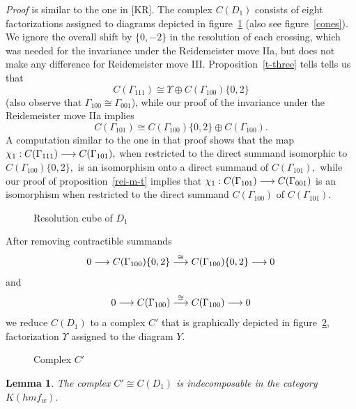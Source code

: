 \documentclass[12pt]{article}
\newtheorem{lemma}{Lemma}
\begin{document}
\emph{Proof} is similar to the one in [KR]. The complex $C(D_1)$ 
consists of eight factorizations assigned to  diagrams depicted in 
figure~\ref{rthree1} (also see figure~\ref{cones}). We ignore the 
overall shift by $\{0,-2\}$ in the resolution of each crossing, which was 
needed for the invariance under the Reidemeister move IIa, but does not
make any difference for Reidemeister move III. Proposition~\ref{t-three} 
tells tells us that 
$$C(\Gamma_{111}) \cong \Upsilon \oplus C(\Gamma_{100})\{0,2\}$$ 
(also observe that $\Gamma_{100}\cong \Gamma_{001}$),  
while our proof of the invariance under the Reidemeister move IIa implies 
$$ C(\Gamma_{101})\cong C(\Gamma_{100})\{0,2\} \oplus  C(\Gamma_{100}).$$ 
A computation similar to the one in that proof shows that the map 
$\chi_1: C(\Gamma_{111}) \longrightarrow C(\Gamma_{101}),$ when 
restricted to the direct summand  isomorphic to $C(\Gamma_{100})\{0,2\},$
is an isomorphism onto a direct summand of $C(\Gamma_{101}),$ while  
our proof of proposition~\ref{rei-m-t} implies that 
$\chi_1:C(\Gamma_{101}) \longrightarrow C(\Gamma_{001})$ is an isomorphism
when restricted to the direct summand $C(\Gamma_{100})$ of 
$C(\Gamma_{101}).$ 

\begin{figure}  \caption{Resolution cube of $D_1$} 
 \label{rthree1} \end{figure}

After removing contractible summands 
$$ 0 \longrightarrow C(\Gamma_{100}) \{ 0,2\} \stackrel{\cong}{\longrightarrow} 
       C(\Gamma_{100}) \{ 0,2\} \longrightarrow 0 $$ 
and
$$0 \longrightarrow C(\Gamma_{100})  \stackrel{\cong}{\longrightarrow} 
       C(\Gamma_{100})  \longrightarrow 0$$
we reduce $C(D_1)$ to a complex $C'$ that is graphically 
depicted in figure~\ref{rthree2}, factorization $\Upsilon$ 
assigned to the diagram $Y.$ 
 

\begin{figure}  \caption{Complex $C'$} 
 \label{rthree2} \end{figure}

\begin{lemma} \label{lemma-indec} 
The complex $C'\cong C(D_1)$ is indecomposable in the 
category $K(hmf_w).$ 
\end{lemma} 
\end{document}
